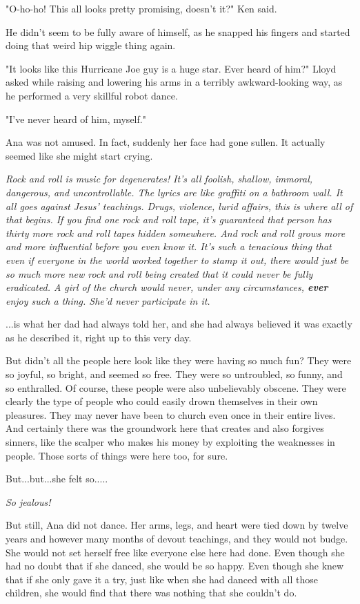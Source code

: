 \documentclass[
]{article}
\begin{document}
"O-ho-ho! This all looks pretty promising, doesn't it?" Ken said.

He didn't seem to be fully aware of himself, as he snapped his fingers
and started doing that weird hip wiggle thing again.

"It looks like this Hurricane Joe guy is a huge star. Ever heard of
him?" Lloyd asked while raising and lowering his arms in a terribly
awkward-looking way, as he performed a very skillful robot dance.

"I've never heard of him, myself."

Ana was not amused. In fact, suddenly her face had gone sullen. It
actually seemed like she might start crying.

\emph{Rock and roll is music for degenerates! It's all foolish, shallow,
immoral, dangerous, and uncontrollable. The lyrics are like graffiti on
a bathroom wall. It all goes against Jesus' teachings. Drugs, violence,
lurid affairs, this is where all of that begins. If you find one rock
and roll tape, it's guaranteed that person has thirty more rock and roll
tapes hidden somewhere. And rock and roll grows more and more
influential before you even know it. It's such a tenacious thing that
even if everyone in the world worked together to stamp it out, there
would just be so much more new rock and roll being created that it could
never be fully eradicated. A girl of the church would never, under any
circumstances, \textbf{ever} enjoy such a thing. She'd never participate
in it.}

\emph{}...is what her dad had always told her, and she had always
believed it was exactly as he described it, right up to this very day.

But didn't all the people here look like they were having so much fun?
They were so joyful, so bright, and seemed so free. They were so
untroubled, so funny, and so enthralled. Of course, these people were
also unbelievably obscene. They were clearly the type of people who
could easily drown themselves in their own pleasures. They may never
have been to church even once in their entire lives. And certainly there
was the groundwork here that creates and also forgives sinners, like the
scalper who makes his money by exploiting the weaknesses in people.
Those sorts of things were here too, for sure.

But...but...she felt so.....

\emph{So jealous!}

But still, Ana did not dance. Her arms, legs, and heart were tied down
by twelve years and however many months of devout teachings, and they
would not budge. She would not set herself free like everyone else here
had done. Even though she had no doubt that if she danced, she would be
so happy. Even though she knew that if she only gave it a try, just like
when she had danced with all those children, she would find that there
was nothing that she couldn't do.
\end{document}
